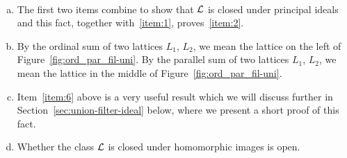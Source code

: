 \begin{remarks}\
  \begin{enumerate}[a.]
  \item 
  The first two items combine to show that $\mathcal{L}$ is closed under
  principal ideals and this fact, together with~\eqref{item:1}, 
  proves~\eqref{item:2}.
  
  

  \item By the ordinal sum of two lattices $L_1$, $L_2$, we mean the lattice
  on the left of Figure~\ref{fig:ord_par_fil-uni}.
  By the parallel sum of two lattices $L_1$, $L_2$, we mean the lattice
  in the middle of Figure~\ref{fig:ord_par_fil-uni}.

\item Item~\eqref{item:6} above is a very useful result which we will discuss further in
  Section~\ref{sec:union-filter-ideal} below, where we present a short proof of
  this fact.

\item Whether the class $\mathcal{L}$ is closed under homomorphic images is open. 
  \end{enumerate}
\end{remarks}

